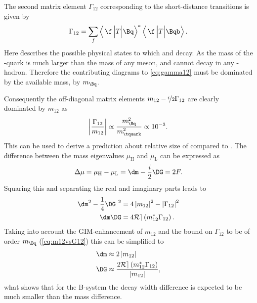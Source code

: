 The second matrix element $\Gamma_{12}$ corresponding to the short-distance transitions is given by
\begin{equation}
\Gamma_{12}=\sum_f\left<\,\f\,\Big|T\Big|\Bq\right>^\ast\left<\,\f\,\Big|T\Big|\Bqb\right>.\label{eq:gamma12}
\end{equation}
Here \f describes the possible physical states to which \Bq and \Bqb decay.
As the mass of the \quark-quark is much larger than the mass of any \B meson, \Bq and \Bqb cannot decay in any \tquark-hadron.
Therefore the contributing diagrams to \cref{eq:gamma12} must be dominated by the available mass, \ie by $m_\Bq$.

Consequently the off-diagonal matrix elements $m_{12}-\nicefrac{i}{2}\Gamma_{12}$ are clearly dominated by $m_{12}$ as
\begin{equation}
\left|\frac{\Gamma_{12}}{m_{12}}\right|\propto\frac{m_\Bq^2}{m_\tquark^2}\propto10^{-3}.\label{eq:m12vsG12}
\end{equation}
This can be used to derive a prediction about relative size of \DG compared to \dm.
The difference between the mass eigenvalues $\mu_\text{H}$ and $\mu_\text{L}$ can be expressed as
\begin{equation}
\Delta\mu=\mu_\text{H}-\mu_\text{L}=\dm-\frac{i}{2}\DG=2F.
\end{equation}
Squaring this and separating the real and imaginary parts leads to
\begin{equation}
\begin{aligned}
\dm^2-\frac{1}{4}\DG^{\kern 3.4pt2}&=4\left|m_{12}\right|^2-\left|\Gamma_{12}\right|^2\\
\dm\DG&=4\mathcal{Re}\left(m_{12}^\ast\Gamma_{12}\right).
\end{aligned}
\end{equation}
Taking into account the GIM-enhancement of $m_{12}$ and the bound on $\Gamma_{12}$ to be of order $m_\Bq$ (\cref{eq:m12vsG12}) this can be simplified to
\begin{equation}
\begin{aligned}
\dm&\approx2\left|m_{12}\right|\\
\DG&\approx\frac{2\mathcal{Re}\left(m_{12}^\ast\Gamma_{12}\right)}{\left|m_{12}\right|},
\end{aligned}
\end{equation}
what shows that for the B-system the decay width difference is expected to be much smaller than the mass difference.

